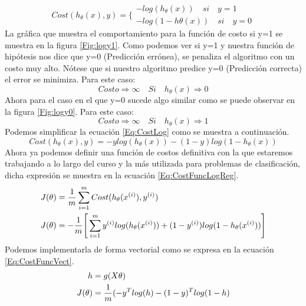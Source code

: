 \documentclass{report}
\begin{document}
\begin{equation}
Cost(h_\theta(x),y)=\Big\{
	\begin{array}{c}
	-log(h_\theta(x))\quad si\quad y=1
	\\-log(1-h\theta(x))\quad si\quad y=0
	\end{array}
	\label{Eq:CostLog}
\end{equation}
La gráfica que muestra el comportamiento para la función de costo si y=1 se muestra en la figura \ref{Fig:logy1}. Como podemos ver si y=1 y nuestra función de hipótesis nos dice que y=0 (Predicción errónea), se penaliza el algoritmo con un costo muy alto. Nótese que si nuestro algoritmo predice y=0 (Predicción correcta) el error se minimiza. Para este caso:\[
Costo \Rightarrow \infty\quad Si\quad h_\theta(x)\Rightarrow0
\]
Ahora para el caso en el que y=0 sucede algo similar como se puede observar en la figura \ref{Fig:logy0}. 
Para este caso:\[
Costo \Rightarrow \infty\quad Si\quad h_\theta(x)\Rightarrow1
\]
Podemos simplificar la ecuación \ref{Eq:CostLog} como se muestra a continuación.
\begin{equation}
	Cost(h_\theta(x),y)=-ylog(h_\theta(x))-(1-y)log(1-h_\theta(x))
	\label{Eq:CostClas}
\end{equation}
Ahora ya podemos definir una función de costos definitiva con la que estaremos trabajando a lo largo del curso y la más utilizada para problemas de clasificación, dicha expresión se muestra en la ecuación \ref{Eq:CostFuncLogReg}.
\begin{align}
	J(\theta)&=\frac{1}{m}\sum_{i=1}^{m}Cost(h_\theta(x^{(i)}),y^{(i)})\notag\\
	J(\theta)&=-\frac{1}{m}\Bigg[\sum_{i=1}^{m}y^{(i)}log(h_\theta(x^{(i)}))+(1-y^{(i)})log(1-h_\theta(x^{(i)}))\Bigg]\label{Eq:CostFuncLogReg}
\end{align}
Podemos implementarla de forma vectorial como se expresa en la ecuación \ref{Eq:CostFuncVect}.
\begin{align}
h&=g(X\theta)\\\notag
J(\theta)&=\frac{1}{m}(-y^Tlog(h)-(1-y)^Tlog(1-h)\label{Eq:CostFuncVect}
\end{align}
\end{document}
